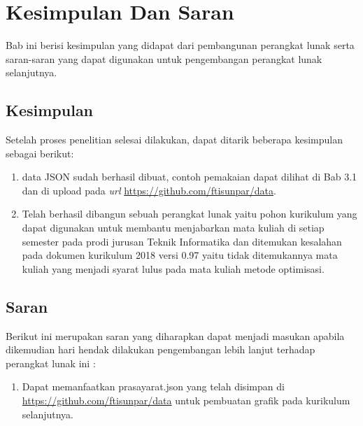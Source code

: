 \chapter{Kesimpulan Dan Saran}
\label{chap:Kesimpulan Dan Saran}

Bab ini berisi kesimpulan yang didapat dari pembangunan perangkat lunak serta saran-saran yang dapat digunakan
untuk pengembangan perangkat lunak selanjutnya.

\section{Kesimpulan}
\label{sec: Kesimpulan}

Setelah proses penelitian selesai dilakukan, dapat ditarik beberapa kesimpulan sebagai berikut:
\begin{enumerate}
\item data JSON sudah berhasil dibuat, contoh pemakaian dapat dilihat di Bab 3.1 dan di upload pada \textit{url} \url{https://github.com/ftisunpar/data}.
\item Telah berhasil dibangun sebuah perangkat lunak yaitu pohon kurikulum yang dapat digunakan untuk membantu menjabarkan mata kuliah di setiap semester pada prodi jurusan Teknik Informatika dan ditemukan kesalahan pada dokumen kurikulum 2018 versi 0.97 yaitu tidak ditemukannya mata kuliah yang menjadi syarat lulus pada mata kuliah metode optimisasi.
\end{enumerate}


\section{Saran}
\label{sec: Saran}

Berikut ini merupakan saran yang diharapkan dapat menjadi masukan apabila dikemudian hari hendak dilakukan pengembangan lebih lanjut terhadap perangkat lunak ini :

\begin{enumerate}
	\item Dapat memanfaatkan prasayarat.json yang telah disimpan di \url{https://github.com/ftisunpar/data} untuk pembuatan grafik pada kurikulum selanjutnya.

\end{enumerate}